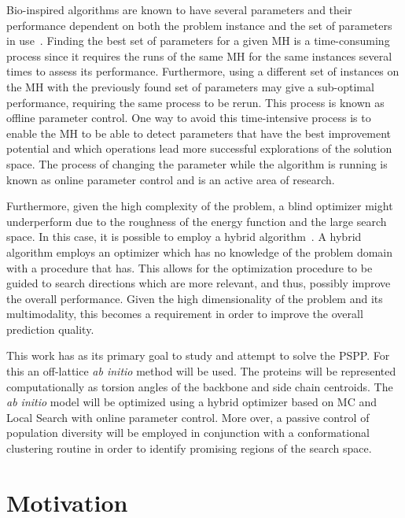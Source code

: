 Bio-inspired algorithms are known to have several parameters and their
performance dependent on both the problem instance and the set of parameters in
use~\cite{parpinelli18review}.
Finding the best set of parameters for a given \ac{MH} is a time-consuming
process since it requires the runs of the same \ac{MH} for the same instances
several times to assess its performance. Furthermore, using a different set of
instances on the \ac{MH} with the previously found set of parameters may give a
sub-optimal performance, requiring the same process to be rerun.  This process
is known as offline parameter control. One way to avoid this time-intensive
process is to enable the \ac{MH} to be able to detect parameters that have the best
improvement potential and which operations lead more successful explorations of
the solution space. The process of changing the parameter while the algorithm
is running is known as online parameter control and is an active area of
research.

Furthermore, given the high complexity of the problem, a blind optimizer might
underperform due to the roughness of the energy function and the large
search space. In this case, it is possible to employ a hybrid
algorithm~\cite{blum2011hybrid}. A hybrid algorithm employs an optimizer which has no
knowledge of the problem domain with a procedure that has. This allows for the
optimization procedure to be guided to search directions which are more
relevant, and thus, possibly improve the overall performance. Given the
high dimensionality of the problem and its multimodality, this becomes a
requirement in order to improve the overall prediction quality.

This work has as its primary goal to study and attempt to solve the \ac{PSPP}. For this an
off-lattice \textit{ab initio} method will be used. The proteins will be
represented computationally as torsion angles of the backbone and side chain
centroids. The \textit{ab initio} model will be optimized using a hybrid
optimizer based on \ac{MC} and Local Search with online parameter control.
More over, a passive control of population diversity will be employed in
conjunction with a conformational clustering routine in order to identify
promising regions of the search space.


\section{Motivation}\label{sec:chap1_motivation}

